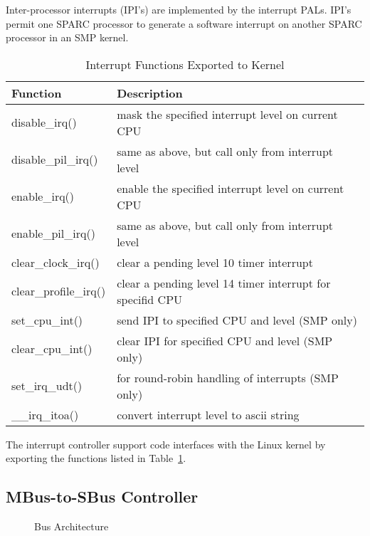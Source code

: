 \documentclass{article}
\begin{document}
  Inter-processor interrupts (IPI's) are implemented by the interrupt
PALs.  IPI's permit one SPARC processor to generate a software interrupt
on another SPARC processor in an SMP kernel.

\begin{table}
\begin{center}
\begin{tabular}{|l|l|}\hline\hline
Function			& Description \\ \hline
disable\_irq()  		& mask the specified interrupt level on current CPU \\
disable\_pil\_irq()  	& same as above, but call only from interrupt level \\
enable\_irq()   		& enable the specified interrupt level on current CPU \\
enable\_pil\_irq()   	& same as above, but call only from interrupt level \\
clear\_clock\_irq()	& clear a pending level 10 timer interrupt \\
clear\_profile\_irq()  	& clear a pending level 14 timer interrupt for specifid CPU \\
set\_cpu\_int()		& send IPI to specified CPU and level (SMP only) \\
clear\_cpu\_int()		& clear IPI for specified CPU and level (SMP only) \\
set\_irq\_udt()		& for round-robin handling of interrupts (SMP only) \\
\_\_irq\_itoa()		& convert interrupt level to ascii string \\ \hline
\end{tabular}
\caption{Interrupt Functions Exported to Kernel}
\label{irqfun}
\end{center}
\end{table}

  The interrupt controller support code interfaces with the Linux kernel by 
exporting the functions listed in Table~\ref{irqfun}.

\subsection{MBus-to-SBus Controller}

\begin{figure}
\begin{center}
\caption{Bus Architecture}
\label{busarch}
\end{center}
\end{figure}
\end{document}
